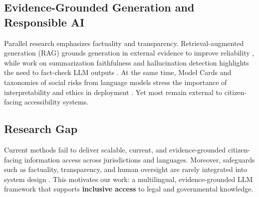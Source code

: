 {\subsection{Evidence-Grounded Generation and Responsible AI}
Parallel research emphasizes factuality and transparency. Retrieval-augmented generation (RAG) grounds generation in external evidence to improve reliability \cite{lewis2020rag}, while work on summarization faithfulness and hallucination detection highlights the need to fact-check LLM outputs \cite{maynez2020faithfulness, ji2023hallucination}. At the same time, Model Cards and taxonomies of social risks from language models stress the importance of interpretability and ethics in deployment \cite{mitchell2021modelcards, bender2021stochastic, weidinger2021taxonomy}. Yet most remain external to citizen-facing accessibility systems.

\subsection{Research Gap}
Current methods fail to deliver scalable, current, and evidence-grounded citizen-facing information access across jurisdictions and languages. Moreover, safeguards such as factuality, transparency, and human oversight are rarely integrated into system design \cite{gama2014drift}. This motivates our work: a multilingual, evidence-grounded LLM framework that supports \textbf{inclusive access} to legal and governmental knowledge.

\begin{table}[t]
\centering
\small
{}
\caption{Conceptual distinction between Legal Information Retrieval and \emph{Multilingual Inclusive Access}.}
\label{tab:conceptual}
\end{table}


}
